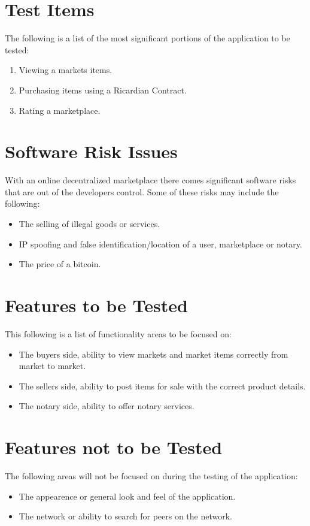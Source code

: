 \documentclass{article}
\begin{document}
\section*{Test Items}
The following is a list of the most significant portions of the application to be tested:
\newline
\begin{enumerate}
 \item
Viewing a markets items.
 \item
Purchasing items using a Ricardian Contract.
 \item
Rating a marketplace.
\end{enumerate}

\section*{Software Risk Issues}
With an online decentralized marketplace there comes significant software risks that are out of the developers control.
Some of these risks may include the following:
\newline
\begin{itemize}
 \item
The selling of illegal goods or services.
 \item
IP spoofing and false identification/location of a user, marketplace or notary.
 \item
The price of a bitcoin.
\end{itemize}

\section*{Features to be Tested}
This following is a list of functionality areas to be focused on:
\newline
\begin{itemize}
 \item
The buyers side, ability to view markets and market items correctly from market to market.
 \item
The sellers side, ability to post items for sale with the correct product details.
 \item
The notary side, ability to offer notary services.
\end{itemize}

\section*{Features not to be Tested}
The following areas will not be focused on during the testing of the application:
\newline
\begin{itemize}
 \item
The appearence or general look and feel of the application.
 \item
The network or ability to search for peers on the network.
\end{itemize}
\end{document}
